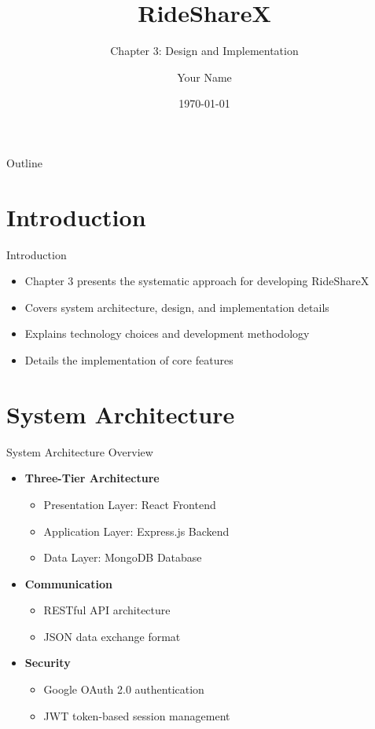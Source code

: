 \documentclass{beamer}
\title{RideShareX}
\subtitle{Chapter 3: Design and Implementation}
\author{Your Name}
\institute{Your University}
\date{\today}
\begin{document}
\begin{frame}
\titlepage
\end{frame}

\begin{frame}{Outline}
\tableofcontents
\end{frame}

\section{Introduction}
\begin{frame}{Introduction}
\begin{itemize}
    \item Chapter 3 presents the systematic approach for developing RideShareX
    \item Covers system architecture, design, and implementation details
    \item Explains technology choices and development methodology
    \item Details the implementation of core features
\end{itemize}
\end{frame}

\section{System Architecture}

\begin{frame}{System Architecture Overview}
\begin{itemize}
    \item \textbf{Three-Tier Architecture}
    \begin{itemize}
        \item Presentation Layer: React Frontend
        \item Application Layer: Express.js Backend
        \item Data Layer: MongoDB Database
    \end{itemize}
    \vspace{0.5cm}
    \item \textbf{Communication}
    \begin{itemize}
        \item RESTful API architecture
        \item JSON data exchange format
    \end{itemize}
    \vspace{0.5cm}
    \item \textbf{Security}
    \begin{itemize}
        \item Google OAuth 2.0 authentication
        \item JWT token-based session management
    \end{itemize}
\end{itemize}
\end{frame}
\end{document}
